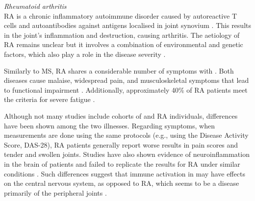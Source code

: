 \bsni
\textit{Rheumatoid arthritis}\\
\noindent
RA is a chronic inflammatory autoimmune disorder caused by autoreactive T cells and autoantibodies against antigens localised in joint synovium \citep{janeway2017Immunology}.
This results in the joint's inflammation and destruction, causing arthritis.
The aetiology of RA remains unclear but it involves a combination of environmental and genetic factors, which also play a role in the disease severity \citep{majithia2007RheumatoidArthritis}.

Similarly to MS, RA shares a considerable number of symptoms with \cfs.
Both diseases cause malaise, widespread pain, and musculoskeletal symptoms that lead to functional impairment \citep{moss-morris2003IllnessPerceptions}.
Additionally, approximately 40\% of RA patients meet the criteria for severe fatigue \citep{katz2017FatigueRheumatoid}.

Although not many studies include cohorts of \cfs and RA individuals, differences have been shown among the two illnesses.
Regarding symptoms, when measurements are done using the same protocols (e.g., using the Disease Activity Score, DAS-28), RA patients generally report worse results in pain scores and tender and swollen joints.
Studies have also shown evidence of neuroinflammation in the brain of \cfs patients and failed to replicate the results for RA under similar conditions \citep{mueller2020NoEvidence}.
Such differences suggest that immune activation in \cfs may have effects on the central nervous system, as opposed to RA, which seems to be a disease primarily of the peripheral joints \citep{mueller2020NoEvidence}.


